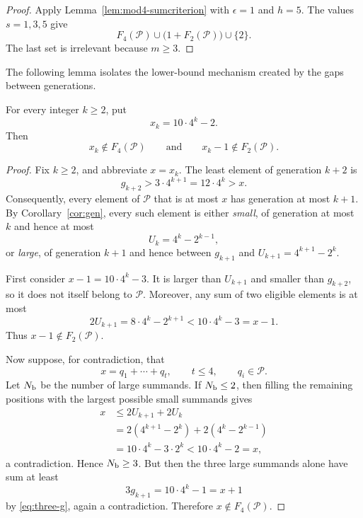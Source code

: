 \documentclass{ws-ijfcs}
\newcommand{\Pset}{\mathcal P}
\begin{document}
\begin{proof}
Apply Lemma~\ref{lem:mod4-sumcriterion} with $\epsilon=1$ and $h=5$.
The values $s=1,3,5$ give
\[
 F_4(\Pset)\cup\bigl(1+F_2(\Pset)\bigr)\cup\{2\}.
\]
The last set is irrelevant because $m\geq3$.
\end{proof}

The following lemma isolates the lower-bound mechanism created by the
gaps between generations.

\begin{lemma}\label{lem:obstruction}
For every integer $k\geq2$, put
\[
 x_k=10\cdot4^k-2.
\]
Then
\begin{equation}\label{eq:obstruction}
 x_k\notin F_4(\Pset)
 \qquad\text{and}\qquad
 x_k-1\notin F_2(\Pset).
\end{equation}
\end{lemma}

\begin{proof}
Fix $k\geq2$, and abbreviate $x=x_k$.  The least element of generation
$k+2$ is
\[
 g_{k+2}>3\cdot4^{k+1}=12\cdot4^k>x.
\]
Consequently, every element of $\Pset$ that is at most $x$ has generation
at most $k+1$.  By Corollary~\ref{cor:gen}, every such element is either
\emph{small}, of generation at most $k$ and hence at most
\[
 U_k=4^k-2^{k-1},
\]
or \emph{large}, of generation $k+1$ and hence between $g_{k+1}$ and
$U_{k+1}=4^{k+1}-2^k$.

First consider $x-1=10\cdot4^k-3$.  It is larger than $U_{k+1}$ and
smaller than $g_{k+2}$, so it does not itself belong to $\Pset$.
Moreover, any sum of two eligible elements is at most
\[
 2U_{k+1}=8\cdot4^k-2^{k+1}<10\cdot4^k-3=x-1.
\]
Thus $x-1\notin F_2(\Pset)$.

Now suppose, for contradiction, that
\[
 x=q_1+\cdots+q_t,
 \qquad t\leq4,
 \qquad q_i\in\Pset.
\]
Let $N_{\rm b}$ be the number of large summands.  If $N_{\rm b}\leq2$,
then filling the remaining positions with the largest possible small
summands gives
\begin{align*}
 x
 &\leq2U_{k+1}+2U_k\\
 &=2(4^{k+1}-2^k)+2(4^k-2^{k-1})\\
 &=10\cdot4^k-3\cdot2^k
 <10\cdot4^k-2=x,
\end{align*}
a contradiction.  Hence $N_{\rm b}\geq3$.  But then the three large
summands alone have sum at least
\[
 3g_{k+1}=10\cdot4^k-1=x+1
\]
by \eqref{eq:three-g}, again a contradiction.  Therefore
$x\notin F_4(\Pset)$.
\end{proof}
\end{document}
